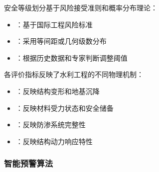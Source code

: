 
安全等级划分基于风险接受准则和概率分布理论：

\begin{itemize}
\tightlist
\item
  ：基于国际工程风险标准
\item
  ：采用等间距或几何级数分布
\item
  ：根据历史数据和专家判断调整阈值
\end{itemize}


各评价指标反映了水利工程的不同物理机制：

\begin{itemize}
\tightlist
\item
  ：反映结构变形和地基沉降
\item
  ：反映材料受力状态和安全储备\\
\item
  ：反映防渗系统完整性
\item
  ：反映结构动力响应特性
\end{itemize}

\hypertarget{ux667aux80fdux9884ux8b66ux7b97ux6cd5}{%
\subsubsection{智能预警算法}\label{ux667aux80fdux9884ux8b66ux7b97ux6cd5}}

